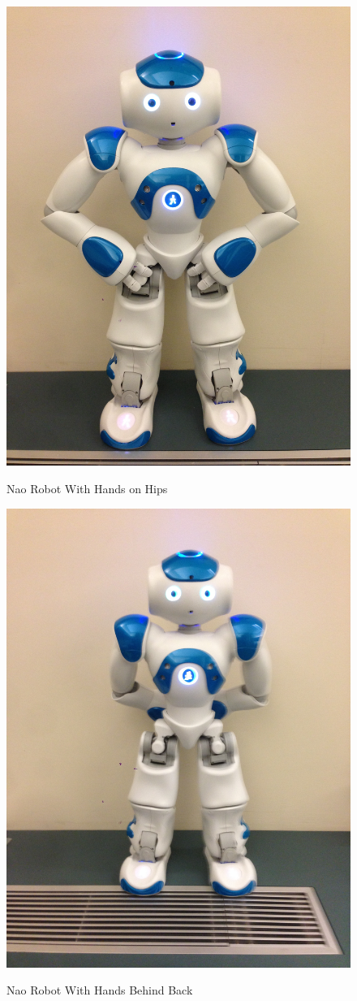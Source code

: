 \documentclass{acm_proc_article-sp}
\begin{document}
\begin{figure}[t!]
\centering
 \includegraphics[width=0.65\linewidth]{hips7.jpg}\\
 \caption{Nao Robot With Hands on Hips}
 \label{f:bert} %
\end{figure}

\begin{figure}[t!]
\centering
 \includegraphics[width=0.65\linewidth]{behind3.jpg}\\
 \caption{Nao Robot With Hands Behind Back}
 \label{f:bert} %
\end{figure}
\end{document}
